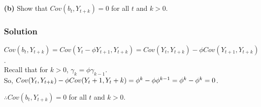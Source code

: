 \documentclass{article}
\begin{document}
\subsection*{}
\textbf{(b)} Show that $Cov(b_t,Y_{t+k}) = 0$ for all $t$ and $k > 0$.

\subsubsection*{Solution}
$Cov(b_t, Y_{t+k}) = Cov(Y_t - \phi Y_{t+1}, Y_{t+k}) =  Cov(Y_t, Y_{t+k}) - \phi Cov(Y_{t+1}, Y_{t+k})$. \\Recall that for $k > 0$, $\gamma_k = \phi\gamma_{k-1}$. \\So, $Cov(Y_t, Y_{t+k}) - \phi Cov(Y_t+1, Y_t+k)\\ = \phi^k - \phi\phi^{k-1}\\ = \phi^{k} - \phi^{k} = 0$.

$\therefore Cov(b_t,Y_{t+k}) = 0$ for all $t$ and $k > 0$.
\end{document}

